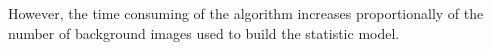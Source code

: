 \documentclass{article}
\begin{document}
	However, the time consuming of the algorithm increases proportionally of the number of background images used to build the statistic model.

	\begin{figure}[H]
		  \centering
		  \hspace{0.1cm}

\end{figure}
\end{document}
